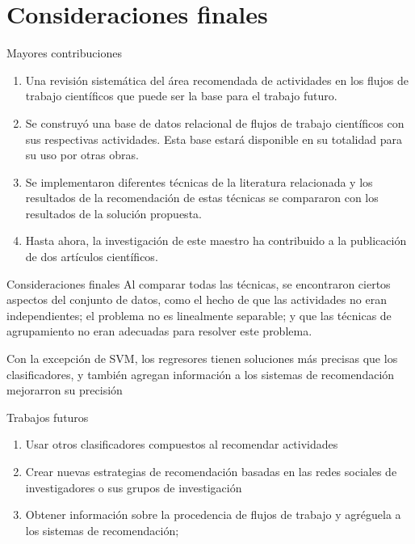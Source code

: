 \section{Consideraciones finales}

\begin{frame}
  	\begin{block}{Mayores contribuciones}
  		\begin{enumerate}
  			\item Una revisión sistemática del área recomendada de actividades en los flujos de trabajo científicos que puede ser la base para el trabajo futuro.
  			\item Se construyó una base de datos relacional de flujos de trabajo científicos con sus respectivas actividades. Esta base estará disponible en su totalidad para su uso por otras obras.
  			\item Se implementaron diferentes técnicas de la literatura relacionada y los resultados de la recomendación de estas técnicas se compararon con los resultados de la solución propuesta.
  			\item Hasta ahora, la investigación de este maestro ha contribuido a la publicación de dos artículos científicos.
  		\end{enumerate}
  		
  	\end{block}
  \end{frame}
	
	\begin{frame}
		\begin{block}{Consideraciones finales}
			Al comparar todas las técnicas, se encontraron ciertos aspectos del conjunto de datos, como el hecho de que las actividades no eran independientes; el problema no es linealmente separable; y que las técnicas de agrupamiento no eran adecuadas para resolver este problema. 
			
			Con la excepción de SVM, los regresores tienen soluciones más precisas que los clasificadores, y también agregan información a los sistemas de recomendación mejorarron su precisión
		\end{block}
	\end{frame}

 \begin{frame}
 	\begin{block}{Trabajos futuros}
 		\begin{enumerate}
 			\item Usar otros clasificadores compuestos al recomendar actividades
 			\item Crear nuevas estrategias de recomendación basadas en las redes sociales de investigadores o sus grupos de investigación
 			\item Obtener información sobre la procedencia de flujos de trabajo y agréguela a los sistemas de recomendación;
 		
		\end{enumerate}		
 	\end{block}
 \end{frame}
 
